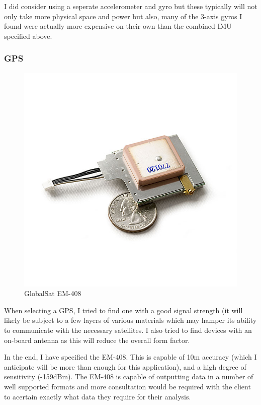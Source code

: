 \documentclass[a4paper, twoside]{article}
\begin{document}
I did consider using a seperate accelerometer and gyro but these typically will
not only take more physical space and power but also, many of the 3-axis gyros I
found were actually more expensive on their own than the combined IMU specified
above.

\subsubsection{GPS}
\begin{figure}
	\vspace{-35pt}
	\begin{center}
		\includegraphics[scale=0.2]{images/em-408.jpg}
	\end{center}
	\vspace{-20pt}
	\caption{GlobalSat EM-408}
\end{figure}

When selecting a GPS, I tried to find one with a good signal strength (it will
likely be subject to a few layers of various materials which may hamper its
ability to communicate with the necessary satellites. I also tried to find
devices with an on-board antenna as this will reduce the overall form factor.

In the end, I have specified the EM-408. This is capable of 10m accuracy (which
I anticipate will be more than enough for this application), and a high degree of
sensitivity (-159dBm). The EM-408 is capable of outputting data in a number of
well supported formats and more consultation would be required with the client
to acertain exactly what data they require for their analysis.
\end{document}
